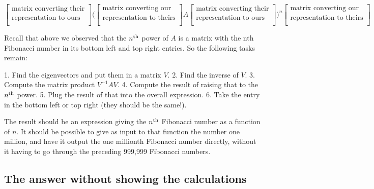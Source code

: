$$
\begin{bmatrix}\text{matrix converting their}\\\text{representation to ours} \\ \end{bmatrix}
\Bigg(
    \begin{bmatrix}\text{matrix converting our}\\\text{representation to theirs} \\ \end{bmatrix}
    A
    \begin{bmatrix}\text{matrix converting their}\\\text{representation to ours} \\ \end{bmatrix}
\Bigg)^n
\begin{bmatrix}\text{matrix converting our}\\\text{representation to theirs} \\ \end{bmatrix}
$$




Recall that above we observed that the $n^{\text{th}}$ power of $A$ is a matrix with the
nth Fibonacci number in its bottom left and top right entries. So the following
tasks remain:

1. Find the eigenvectors and put them in a matrix $V$.
2. Find the inverse of $V$.
3. Compute the matrix product $V^{-1}AV$.
4. Compute the result of raising that to the $n^{\text{th}}$ power.
5. Plug the result of that into the overall expression.
6. Take the entry in the bottom left or top right (they should be the same!).

The result should be an expression giving the $n^{\text{th}}$ Fibonacci number as a
function of $n$. It should be possible to give as input to that function the
number one million, and have it output the one millionth Fibonacci number
directly, without it having to go through the preceding 999,999 Fibonacci
numbers.


\subsection{The answer without showing the calculations}

